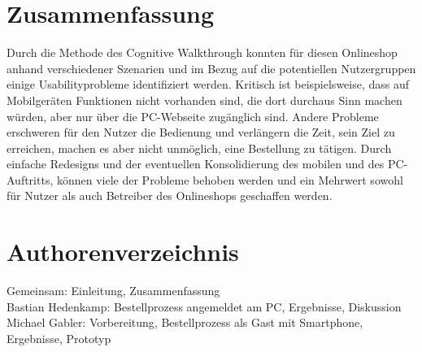 \documentclass[	12pt, 
				a4paper, 
				BCOR=10mm, %
				DIV=12, 
				parskip=half, %
				headings=small, %
				twoside, %
				ngerman,
				bibliography=totoc,index=totoc, listof=totoc,
				numbers=noendperiod
				]{scrbook} %
\theoremstyle{plain}%
\theoremstyle{definition}
\theoremstyle{remark}
\begin{document}
\chapter{Zusammenfassung}
Durch die Methode des Cognitive Walkthrough konnten für diesen Onlineshop anhand verschiedener Szenarien und im Bezug auf die potentiellen Nutzergruppen einige Usabilityprobleme identifiziert werden. Kritisch ist beispielsweise, dass auf Mobilgeräten Funktionen nicht vorhanden sind, die dort durchaus Sinn machen würden, aber nur über die PC-Webseite zugänglich sind. Andere Probleme erschweren für den Nutzer die Bedienung und verlängern die Zeit, sein Ziel zu erreichen, machen es aber nicht unmöglich, eine Bestellung zu tätigen. Durch einfache Redesigns und der eventuellen Konsolidierung des mobilen und des PC-Auftritts, können viele der Probleme behoben werden und ein Mehrwert sowohl für Nutzer als auch Betreiber des Onlineshops geschaffen werden.


\newpage
 \printbibliography	%

\appendix 				%

\newpage
\chapter{Authorenverzeichnis}
Gemeinsam: Einleitung, Zusammenfassung\\
Bastian Hedenkamp: Bestellprozess angemeldet am PC, Ergebnisse, Diskussion \\
Michael Gabler: Vorbereitung, Bestellprozess als Gast mit Smartphone, Ergebnisse, Prototyp 
\end{document}
